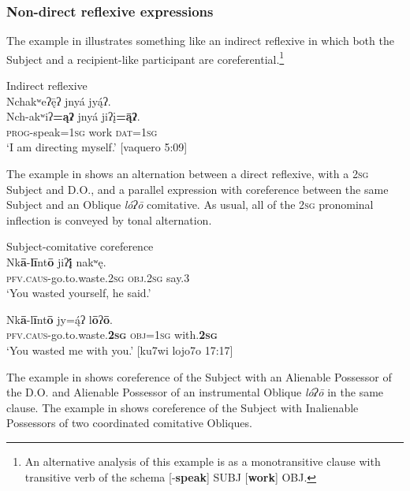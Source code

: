 \documentclass[output=paper]{../langscibook}
\begin{document}
\subsubsection{Non-direct reflexive expressions}
\label{sec:campbell:4.2.1}
The example in  illustrates something like an indirect reflexive \citep[74]{Kemmer1993} in which both the Subject and a recipient-like participant are coreferential.\footnote{An alternative analysis of this example is as a monotransitive clause with transitive verb of the schema [-\textbf{speak}] SUBJ [\textbf{work}] OBJ.}


\ea\label{ex:campbell:30}
{Indirect reflexive} \\
 Nchakʷeʔ\={ę}ʔ jnyá jy\'{ą}ʔ.\\
    \gll  Nch-akʷiʔ\textbf{=ąʔ}  jnyá  jiʔį\textbf{=\={ą}ʔ}.\\
     \textsc{prog}{}-speak=1\textsc{sg}  work  \textsc{dat=1sg}  \\
\glt ‘I am directing myself.’ [vaquero 5:09]
\z


The example in  shows an alternation between a direct reflexive, with a 2\textsc{sg} Subject and D.O., and a parallel expression with coreference between the same Subject and an Oblique \textit{lóʔō} comitative. As usual, all of the 2\textsc{sg} pronominal inflection is conveyed by tonal alternation.


\ea\label{ex:campbell:31}
{Subject-comitative coreference}\\
\ea
\gll Nk\textbf{ā}{}-\textbf{lī}nt\textbf{ō}  jiʔ\textbf{į́}  nakʷę.\\
     \textsc{pfv.caus}{}-go.to.waste.\textsc{2sg}  \textsc{obj}.\textsc{2sg}  say.3\\
\glt ‘You wasted yourself, he said.’

\ex
\gll Nk\textbf{ā}{}-l\textbf{ī}nt\textbf{ō}  jy=\'{ą}ʔ  l\textbf{ō}ʔ\textbf{ō}.\\
     \textsc{pfv.caus}{}-go.to.waste.\textbf{\textsc{2sg}}  \textsc{obj}=\textsc{1sg}  with.\textbf{\textsc{2sg}}\\
\glt ‘You wasted me with you.’ [ku7wi lojo7o 17:17]
\z
\z


The example in  shows coreference of the Subject with an Alienable Possessor of the D.O. and Alienable Possessor of an instrumental Oblique \textit{lóʔō} in the same clause. The example in  shows coreference of the Subject with Inalienable Possessors of two coordinated comitative Obliques.
\end{document}
